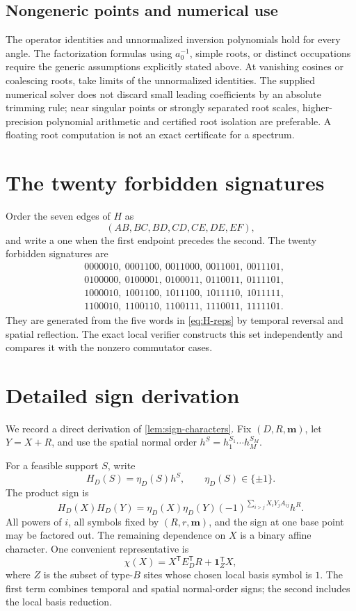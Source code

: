 \documentclass[10pt,letterpaper]{article}
\begin{document}
\subsection{Nongeneric points and numerical use}
The operator identities and unnormalized inversion polynomials hold for every angle. The factorization formulas using $a_0^{-1}$, simple roots, or distinct occupations require the generic assumptions explicitly stated above. At vanishing cosines or coalescing roots, take limits of the unnormalized identities. The supplied numerical solver does not discard small leading coefficients by an absolute trimming rule; near singular points or strongly separated root scales, higher-precision polynomial arithmetic and certified root isolation are preferable. A floating root computation is not an exact certificate for a spectrum.
\section{The twenty forbidden signatures}\label{app:forbidden-list}

Order the seven edges of \(H\) as
\[
 (AB,BC,BD,CD,CE,DE,EF),
\]
and write a one when the first endpoint precedes the second.  The twenty forbidden signatures are
\begin{align*}
&0000010,\ 0001100,\ 0011000,\ 0011001,\ 0011101,\\
&0100000,\ 0100001,\ 0100011,\ 0110011,\ 0111101,\\
&1000010,\ 1001100,\ 1011100,\ 1011110,\ 1011111,\\
&1100010,\ 1100110,\ 1100111,\ 1110011,\ 1111101.
\end{align*}
They are generated from the five words in \eqref{eq:H-reps} by temporal reversal and spatial reflection.  The exact local verifier constructs this set independently and compares it with the nonzero commutator cases.

\section{Detailed sign derivation}\label{app:signs}

We record a direct derivation of \cref{lem:sign-characters}.  Fix \((D,R,\bm m)\), let \(Y=X+R\), and use the spatial normal order \(h^S=h_1^{S_1}\cdots h_M^{S_M}\).

For a feasible support \(S\), write
\[
 H_D(S)=\eta_D(S)h^S,
 \qquad \eta_D(S)\in\{\pm1\}.
\]
The product sign is
\begin{equation}\label{eq:normal-product-sign}
 H_D(X)H_D(Y)
 =\eta_D(X)\eta_D(Y)(-1)^{\sum_{i>j}X_iY_jA_{ij}}h^R.
\end{equation}
All powers of \(i\), all symbols fixed by \((R,r,\bm m)\), and the sign at one base point may be factored out.  The remaining dependence on \(X\) is a binary affine character.  One convenient representative is
\begin{equation}\label{eq:raw-character}
 \chi(X)=X^{\mathsf T}E_D^{\mathsf T}R+\mathbf1_Z^{\mathsf T}X,
\end{equation}
where \(Z\) is the subset of type-\(B\) sites whose chosen local basis symbol is \(1\).  The first term combines temporal and spatial normal-order signs; the second includes the local basis reduction.
\end{document}
